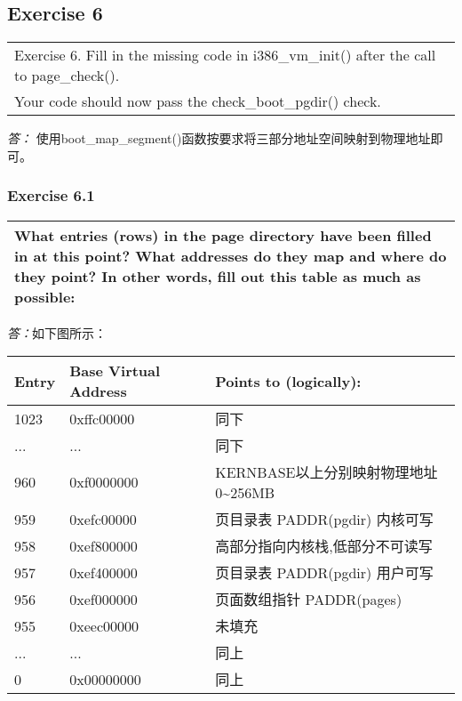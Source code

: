 \documentclass[11pt,a4paper]{article}
\begin{document}
\subsection{Exercise 6}
\begin{tabular}{|p{\textwidth}|}
\hline
Exercise 6.  Fill in the missing code in i386\_vm\_init() after the call to page\_check().\\
Your code should now pass the check\_boot\_pgdir() check. \\
\hline
\end{tabular}
\textit{\large{答：}}
使用boot\_map\_segment()函数按要求将三部分地址空间映射到物理地址即可。

\subsubsection{Exercise 6.1}
\begin{tabular}{|p{\textwidth}|}
\hline
What entries (rows) in the page directory have been filled in at this point? What addresses do they map and where do they point? In other words, fill out this table as much as possible:\\
\hline
\end{tabular}
\textit{\large{答：}}如下图所示：\\
\begin{tabular}{|l|l|l|}
\hline
Entry & Base Virtual Address & Points to (logically):\\
\hline
1023 & 0xffc00000 & 同下\\
\hline
... & ... & 同下\\
\hline
960 & 0xf0000000 & KERNBASE以上分别映射物理地址0\~{}256MB\\
\hline
959 & 0xefc00000 & 页目录表 PADDR(pgdir) 内核可写\\
\hline
958 & 0xef800000 & 高部分指向内核栈,低部分不可读写\\
\hline
957 & 0xef400000 & 页目录表 PADDR(pgdir) 用户可写\\
\hline
956 & 0xef000000 & 页面数组指针 PADDR(pages)\\
\hline
955 & 0xeec00000 & 未填充\\
\hline
... & ... & 同上\\
\hline
0 & 0x00000000 & 同上\\
\hline
\end{tabular}
\end{document}
